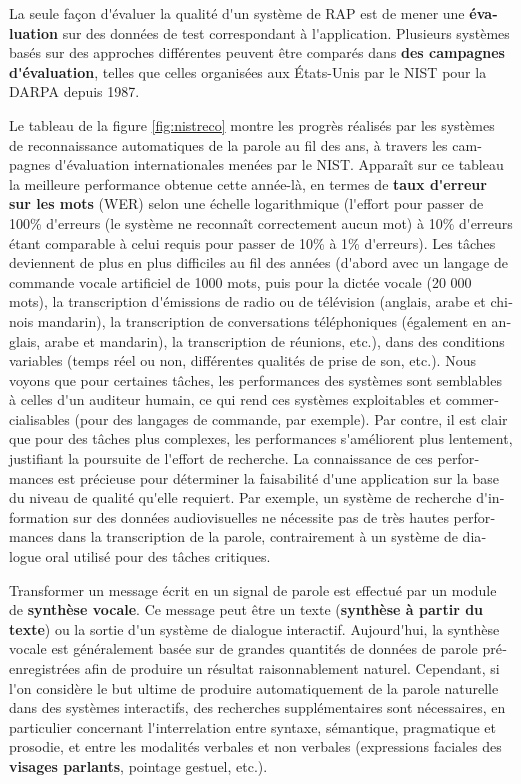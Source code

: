 \documentclass[]{../metanetpaper}
\begin{document}
\begin{french}
\begin{multicols}{2}
La seule façon d{\mbox '}évaluer la qualité d{\mbox '}un système de RAP est de mener
une {\bf évaluation} sur des données de test correspondant à
l{\mbox '}application. Plusieurs systèmes basés sur des approches différentes
peuvent être comparés dans {\bf des campagnes d{\mbox '}évaluation}, telles que
celles organisées aux États-Unis par le NIST pour la DARPA depuis 1987.

Le tableau de la figure \ref{fig:nistreco} montre les progrès réalisés
par les systèmes de reconnaissance automatiques de la parole au fil
des ans, à travers les campagnes d{\mbox '}évaluation internationales
menées par le NIST. Apparaît sur ce tableau la meilleure performance
obtenue cette année-là, en termes de {\bf taux d{\mbox '}erreur sur
  les mots} (WER) selon une échelle logarithmique (l{\mbox '}effort
pour passer de 100\% d{\mbox '}erreurs (le système ne reconnaît
correctement aucun mot) à 10\% d{\mbox '}erreurs étant comparable à
celui requis pour passer de 10\% à 1\% d{\mbox '}erreurs). Les tâches
deviennent de plus en plus difficiles au fil des années (d{\mbox
  '}abord avec un langage de commande vocale artificiel de 1000 mots,
puis pour la dictée vocale (20 000 mots), la transcription d{\mbox
  '}émissions de radio ou de télévision (anglais, arabe et chinois
mandarin), la transcription de conversations téléphoniques (également
en anglais, arabe et mandarin), la transcription de réunions, etc.),
dans des conditions variables (temps réel ou non, différentes qualités
de prise de son, etc.). Nous voyons que pour certaines tâches, les
performances des systèmes sont semblables à celles d{\mbox '}un
auditeur humain, ce qui rend ces systèmes exploitables et
commercialisables (pour des langages de commande, par exemple). Par
contre, il est clair que pour des tâches plus complexes, les
performances s{\mbox '}améliorent plus lentement, justifiant la
poursuite de l{\mbox '}effort de recherche. La connaissance de ces
performances est précieuse pour déterminer la faisabilité d{\mbox
  '}une application sur la base du niveau de qualité qu{\mbox '}elle
requiert. Par exemple, un système de recherche d{\mbox '}information 
sur des données audiovisuelles ne nécessite pas de très hautes
performances dans la transcription de la parole, contrairement à un
système de dialogue oral utilisé pour des tâches critiques.

Transformer un message écrit en un signal de parole est effectué par
un module de {\bf synthèse vocale}. Ce message peut être un texte
({\bf synthèse à partir du texte}) ou la sortie d{\mbox '}un système de dialogue
interactif. Aujourd{\mbox '}hui, la synthèse vocale est généralement basée sur
de grandes quantités de données de parole préenregistrées afin de
produire un résultat raisonnablement naturel. Cependant, si l{\mbox '}on
considère le but ultime de produire automatiquement de la parole
naturelle dans des systèmes interactifs, des recherches
supplémentaires sont nécessaires, en particulier concernant
l{\mbox '}interrelation entre syntaxe, sémantique, pragmatique et prosodie, et
entre les modalités verbales et non verbales (expressions faciales des
{\bf visages parlants}, pointage gestuel, etc.).


\end{multicols}
\end{french}
\end{document}
